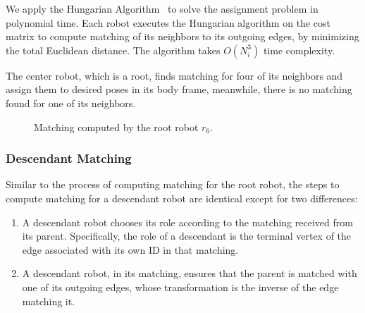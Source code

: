 We apply the Hungarian Algorithm~\cite{Kuh55} to solve the assignment problem in polynomial time. 
%
Each robot executes the Hungarian algorithm on the cost matrix
to compute matching of its neighbors to its outgoing edges, by minimizing the total Euclidean distance. 
%
The algorithm takes $O(N_i^3)$ time complexity.

%
The center robot, which is a root, finds matching for four of its
neighbors and assign them to desired poses in its body frame, meanwhile, there
is no matching found for one of its neighbors.
\begin{figure}
    \centering
    \begin{minipage}{0.9\textwidth}
    \centering
    
    \end{minipage}
    \caption{Matching computed by the root robot $r_6$.}
    \label{fig:formsquare}
\end{figure}
\begin{figure}
    \centering
    
    \label{fig:formsquare-auth}
\end{figure}

\subsubsection{Descendant Matching}

Similar to the process of computing matching for the root robot, the steps to compute matching for a descendant robot are identical except for two differences:
\begin{enumerate}
\item A descendant robot chooses its role according to the matching received from its parent.  
%
    Specifically, the role of a descendant is the terminal vertex of
  the edge associated with its own ID in that matching. 
\item A descendant robot, in its matching, ensures that the parent is
  matched with one of its outgoing edges, whose transformation is the inverse of the edge matching it.
\end{enumerate}

